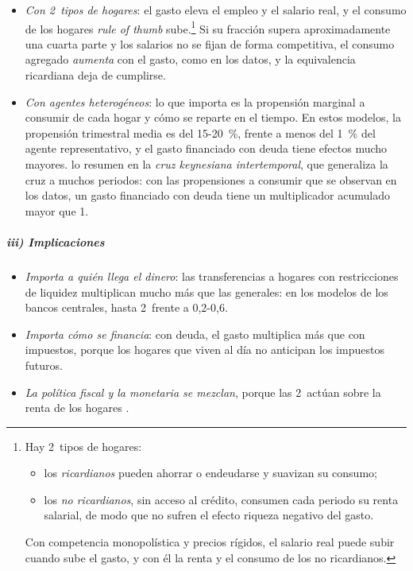 \documentclass[11pt]{article}
\begin{document}
\begin{itemize}
\item \emph{Con 2~tipos de hogares}: el gasto eleva el empleo y el salario real, y el consumo de los hogares \emph{rule of thumb} sube.\footnote{Hay 2~tipos de hogares:
\begin{itemize}
\item los \emph{ricardianos} pueden ahorrar o endeudarse y suavizan su consumo;
\item los \emph{no ricardianos}, sin acceso al crédito, consumen cada periodo su renta salarial, de modo que no sufren el efecto riqueza negativo del gasto.
\end{itemize}
Con competencia monopolística y precios rígidos, el salario real puede subir cuando sube el gasto, y con él la renta y el consumo de los no ricardianos\nocite{GaliLopezSalidoValles2007}.} Si su fracción supera aproximadamente una cuarta parte y los salarios no se fijan de forma competitiva, el consumo agregado \emph{aumenta} con el gasto, como en los datos, y la equivalencia ricardiana deja de cumplirse.
\item \emph{Con agentes heterogéneos}: lo que importa es la propensión marginal a consumir de cada hogar y cómo se reparte en el tiempo. En estos modelos, la propensión trimestral media es del 15-20~\%, frente a menos del 1~\% del agente representativo, y el gasto financiado con deuda tiene efectos mucho mayores\nocite{KaplanViolante2018Microeconomic}. \textcite{AuclertRognlieStraub2024} lo resumen en la \emph{cruz keynesiana intertemporal}, que generaliza la cruz a muchos periodos: con las propensiones a consumir que se observan en los datos, un gasto financiado con deuda tiene un multiplicador acumulado mayor que 1.
\end{itemize}

\subparagraph{iii) Implicaciones}

\begin{itemize}
\item \emph{Importa a quién llega el dinero}: las transferencias a hogares con restricciones de liquidez multiplican mucho más que las generales: en los modelos de los bancos centrales, hasta 2~frente a 0,2-0,6\nocite{Coenen2012Multiplicadores,Ramey2019Ten}.
\item \emph{Importa cómo se financia}: con deuda, el gasto multiplica más que con impuestos, porque los hogares que viven al día no anticipan los impuestos futuros.
\item \emph{La política fiscal y la monetaria se mezclan}, porque las 2~actúan sobre la renta de los hogares\nocite{KaplanMollViolante2018Monetary} .
\end{itemize}
\end{document}
